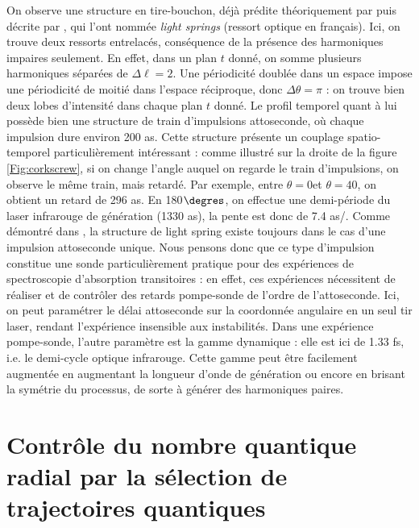 On observe une structure en tire-bouchon, déjà prédite théoriquement par  puis décrite par , qui l'ont nommée \textit{light springs} (ressort optique en français). Ici, on trouve deux ressorts entrelacés, conséquence de la présence des harmoniques impaires seulement. En effet, dans un plan $t$ donné, on somme plusieurs harmoniques séparées de $\Delta\ell = 2$. Une périodicité doublée dans un espace impose une périodicité de moitié dans l'espace réciproque, donc $\Delta\theta = \pi$ : on trouve bien deux lobes d'intensité dans chaque plan $t$ donné. Le profil temporel quant à lui possède bien une structure de train d'impulsions attoseconde, où chaque impulsion dure environ 200 as. Cette structure présente un couplage spatio-temporel particulièrement intéressant : comme illustré sur la droite de la figure \ref{Fig:corkscrew}, si on change l'angle auquel on regarde le train d'impulsions, on observe le même train, mais retardé. Par exemple, entre $\theta=0$\degres et $\theta=40$\degres, on obtient un retard de 296 as. En 180$\degres$, on effectue une demi-période du laser infrarouge de génération (1330 as), la pente est donc de 7.4 as/\degres. 
Comme démontré dans , la structure de light spring existe toujours dans le cas d'une impulsion attoseconde unique. Nous pensons donc que ce type d'impulsion constitue une sonde particulièrement pratique pour des expériences de spectroscopie d'absorption transitoires : en effet, ces expériences nécessitent de réaliser et de contrôler des retards pompe-sonde de l'ordre de l'attoseconde. Ici, on peut paramétrer le délai attoseconde sur la coordonnée angulaire en un seul tir laser, rendant l'expérience insensible aux instabilités. Dans une expérience pompe-sonde, l'autre paramètre est la gamme dynamique : elle est ici de 1.33 fs, i.e. le demi-cycle optique infrarouge. Cette gamme peut être facilement augmentée en augmentant la longueur d'onde de génération ou encore en brisant la symétrie du processus, de sorte à générer des harmoniques paires.

\chapter{Contrôle du nombre quantique radial par la sélection de trajectoires quantiques}
\label{sec:pmodes}
